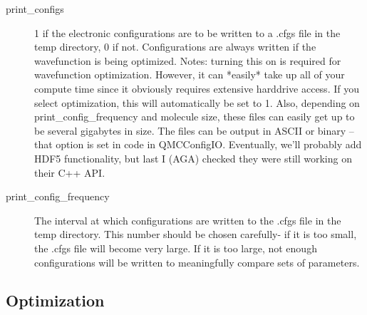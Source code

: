 \documentclass[11pt]{article}
\begin{document}
\begin{description}
\item [print\_configs] 1 if the electronic configurations are to be
  written to a .cfgs file in the temp directory, 0 if not.
  Configurations are always written if the wavefunction is being
  optimized. Notes: turning this on is required for wavefunction optimization.                                                                                                   
     However, it can *easily* take up all of your compute time since it                                                                                                  
     obviously requires extensive harddrive access. If you select optimization,                                                                                                    
     this will automatically be set to 1.                                                                                                    
     Also, depending on print\_config\_frequency and molecule size, these                                                                                                  
     files can easily get up to be several gigabytes in size. The files                                                                                                  
     can be output in ASCII or binary -- that option is set in code in QMCConfigIO.                                
     Eventually, we'll probably add HDF5 functionality, but last I (AGA) checked                                                                                         
     they were still working on their C++ API.  

\item [print\_config\_frequency] The interval at which configurations are
  written to the .cfgs file in the temp directory.  This number should
  be chosen carefully- if it is too small, the .cfgs file will become
  very large.  If it is too large, not enough configurations will be
  written to meaningfully compare sets of parameters.  

\end{description}

\subsection{Optimization}
\end{document}

